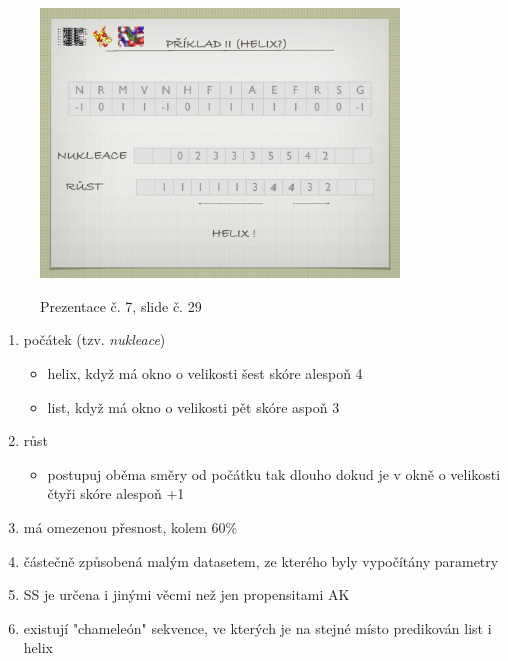 \documentclass[DIV=8]{scrreprt}
\begin{document}
\begin{itemize}[nosep]
\begin{figure}
    \centering
    \label{slides-7-slide-28}
\end{figure}
\begin{figure}
    \caption{Prezentace č. 7, slide č. 29}
    \includegraphics[width=0.85\textwidth]{slides-7/slide-29.jpg}
    \centering
    \label{slides-7-slide-29}
\end{figure}

\begin{enumerate}[nosep]
    \item počátek (tzv. \emph{nukleace})
\begin{itemize}[nosep]
    \item helix, když má okno o velikosti šest skóre alespoň 4
    \item list, když má okno o velikosti pět skóre aspoň 3
\end{itemize}

    \item růst
\begin{itemize}[nosep]
    \item postupuj oběma směry od počátku tak dlouho dokud je v okně o velikosti čtyři skóre alespoň +1
\end{itemize}

    \item má omezenou přesnost, kolem 60\%
    \item částečně způsobená malým datasetem, ze kterého byly vypočítány parametry
    \item SS je určena i jinými věcmi než jen propensitami AK
    \item existují "chameleón" sekvence, ve kterých je na stejné místo predikován list i helix
\end{enumerate}

\end{itemize}
\end{document}
